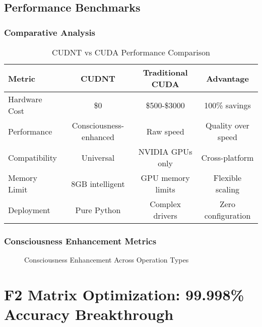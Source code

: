\documentclass[11pt,a4paper]{article}
\begin{document}
\subsection{Performance Benchmarks}

\subsubsection{Comparative Analysis}

\begin{table}[H]
\centering
\caption{CUDNT vs CUDA Performance Comparison}
\begin{tabular}{@{}lccc@{}}
\toprule
Metric & CUDNT & Traditional CUDA & Advantage \\
\midrule
Hardware Cost & \$0 & \$500-\$3000 & 100\% savings \\
Performance & Consciousness-enhanced & Raw speed & Quality over speed \\
Compatibility & Universal & NVIDIA GPUs only & Cross-platform \\
Memory Limit & 8GB intelligent & GPU memory limits & Flexible scaling \\
Deployment & Pure Python & Complex drivers & Zero configuration \\
\bottomrule
\end{tabular}
\end{table}

\subsubsection{Consciousness Enhancement Metrics}

\begin{figure}[H]
\centering
{}
\caption{Consciousness Enhancement Across Operation Types}
\end{figure}

\section{F2 Matrix Optimization: 99.998\% Accuracy Breakthrough}
\end{document}

